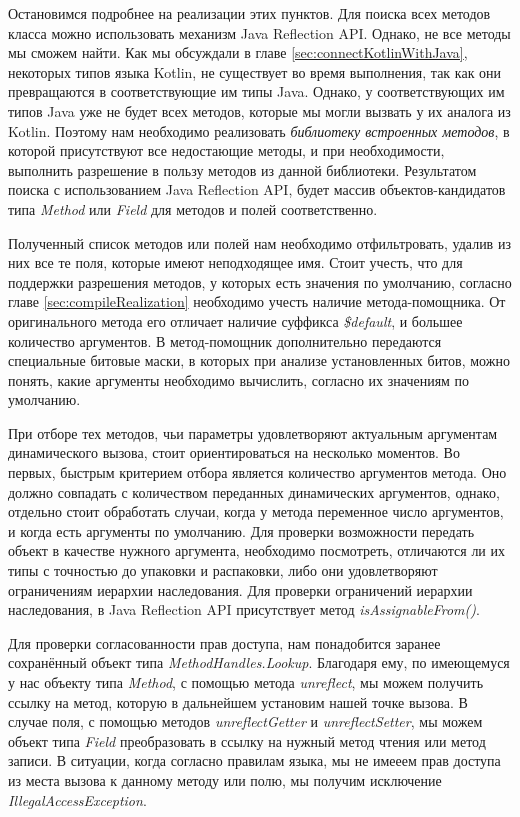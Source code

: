 Остановимся подробнее на реализации этих пунктов. Для поиска всех методов класса можно использовать механизм Java Reflection API. Однако, не все методы мы сможем найти. Как мы обсуждали в главе \ref{sec:connectKotlinWithJava}, некоторых типов языка Kotlin, не существует во время выполнения, так как они превращаются в соответствующие им типы Java. Однако, у соответствующих им типов Java уже не будет всех методов, которые мы могли вызвать у их аналога из Kotlin. Поэтому нам необходимо реализовать \textit{библиотеку встроенных методов}, в которой присутствуют все недостающие методы, и при необходимости, выполнить разрешение в пользу методов из данной библиотеки. Результатом поиска с использованием Java Reflection API, будет массив объектов-кандидатов типа \textit{Method} или 
\textit{Field} для методов и полей соответственно.

Полученный список методов или полей нам необходимо отфильтровать, удалив из них все те поля, которые имеют неподходящее имя. Стоит учесть, что для поддержки разрешения методов, у которых есть значения по умолчанию, согласно главе \ref{sec:compileRealization} необходимо учесть наличие метода-помощника. От оригинального метода его отличает наличие суффикса \textit{\$default}, и большее количество аргументов. В метод-помощник дополнительно передаются специальные битовые маски, в которых при анализе установленных битов, можно понять, какие аргументы необходимо вычислить, согласно их значениям по умолчанию.

При отборе тех методов, чьи параметры удовлетворяют актуальным аргументам динамического вызова, стоит ориентироваться на несколько моментов. Во первых, быстрым критерием отбора является количество аргументов метода. Оно должно совпадать с количеством переданных динамических аргументов, однако, отдельно стоит обработать случаи, когда у метода переменное число аргументов, и когда есть аргументы по умолчанию. Для проверки возможности передать объект в качестве нужного аргумента, необходимо посмотреть, отличаются ли их типы с точностью до упаковки и распаковки, либо они удовлетворяют ограничениям иерархии наследования. Для проверки ограничений иерархии наследования, в Java Reflection API присутствует метод \textit{isAssignableFrom()}.

Для проверки согласованности прав доступа, нам понадобится заранее сохранённый объект типа \textit{MethodHandles.Lookup}. Благодаря ему, по имеющемуся у нас объекту типа \textit{Method}, с помощью метода \textit{unreflect}, мы можем получить ссылку на метод, которую в дальнейшем установим нашей точке вызова. В случае поля, с помощью методов \textit{unreflectGetter} и 
\textit{unreflectSetter}, мы можем объект типа \textit{Field} преобразовать в ссылку на нужный метод чтения или метод записи. В ситуации, когда согласно правилам языка, мы не имееем прав доступа из места вызова к данному методу или полю, мы получим исключение \textit{IllegalAccessException}.

